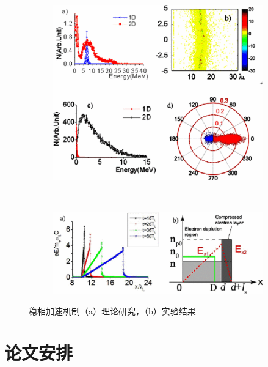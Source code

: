 \begin{figure}[!htbp]
  \centering
  \begin{subfigure}[b]{\MySubFactor\textwidth}
    \includegraphics[width=\textwidth]{Img/PSA1.eps}
    \caption{}
    \label{fig:psa1}
  \end{subfigure}%
  ~%
  \begin{subfigure}[b]{\MySubFactor\textwidth}
    \includegraphics[width=\textwidth]{Img/PSA2.eps}
    \caption{}
    \label{fig:psa2}
  \end{subfigure}
  \caption{稳相加速机制（a）理论研究，（b）实验结果}
  \label{fig:psa}
\end{figure}






\section{论文安排}
